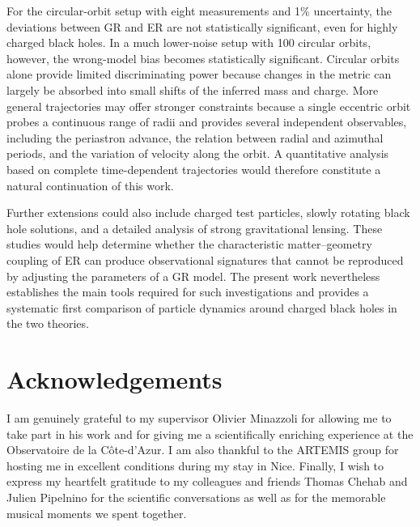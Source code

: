 \documentclass[floats,floatfix,aps, preprintnumbers,nofootinbib]{revtex4-2}
\begin{document}
For the circular-orbit setup with eight measurements and 1\% uncertainty, the deviations between GR and ER are not statistically significant, even for highly charged black holes. In a much lower-noise setup with 100 circular orbits, however, the wrong-model bias becomes statistically significant. Circular orbits alone provide limited discriminating power because changes in the metric can largely be absorbed into small shifts of the inferred mass and charge. More general trajectories may offer stronger constraints because a single eccentric orbit probes a continuous range of radii and provides several independent observables, including the periastron advance, the relation between radial and azimuthal periods, and the variation of velocity along the orbit. A quantitative analysis based on complete time-dependent trajectories would therefore constitute a natural continuation of this work.

Further extensions could also include charged test particles, slowly rotating black hole solutions, and a detailed analysis of strong gravitational lensing. These studies would help determine whether the characteristic matter–geometry coupling of ER can produce observational signatures that cannot be reproduced by adjusting the parameters of a GR model. The present work nevertheless establishes the main tools required for such investigations and provides a systematic first comparison of particle dynamics around charged black holes in the two theories.
















\section{Acknowledgements}

I am genuinely grateful to my supervisor Olivier Minazzoli for allowing me to take part in his work and for giving me a scientifically enriching experience at the Observatoire de la Côte-d'Azur. I am also thankful to the ARTEMIS group for hosting me in excellent conditions during my stay in Nice. Finally, I wish to express my heartfelt gratitude to my colleagues and friends Thomas Chehab and Julien Pipelnino for the scientific conversations as well as for the memorable musical moments we spent together.
\end{document}
